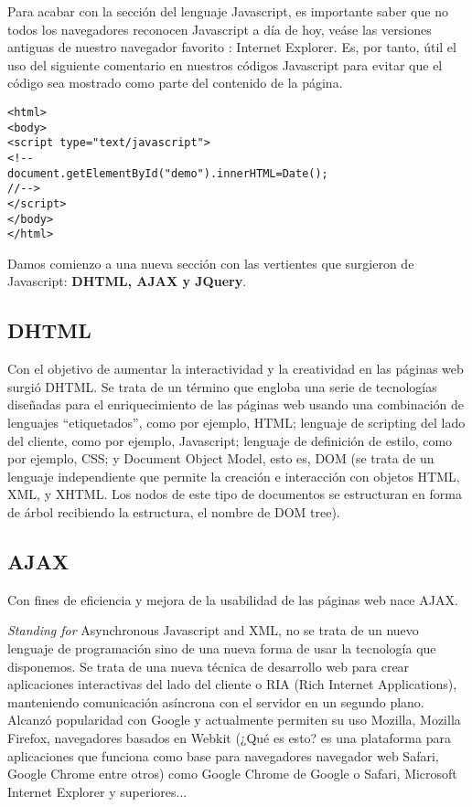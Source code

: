 \documentclass{apuntes}
\begin{document}
Para acabar con la sección del lenguaje Javascript, es importante saber que no todos los navegadores reconocen Javascript a día de hoy, veáse las versiones antiguas de nuestro navegador favorito : Internet Explorer. Es, por tanto, útil el uso del siguiente comentario en nuestros códigos Javascript para evitar que el código sea mostrado como parte del contenido de la página.

\begin{verbatim}
<html>
<body>
<script type="text/javascript">
<!--
document.getElementById("demo").innerHTML=Date();
//-->
</script>
</body>
</html>
\end{verbatim}

Damos comienzo a una nueva sección con las vertientes que surgieron de Javascript: \textbf{DHTML, AJAX y JQuery}. 

\subsection{DHTML }
Con el objetivo de aumentar la interactividad y la creatividad en las páginas web surgió DHTML. Se trata de un término que engloba una serie de tecnologías diseñadas para el enriquecimiento de las páginas web usando una combinación de lenguajes “etiquetados”, como por ejemplo, HTML; lenguaje de scripting del lado del cliente, como por ejemplo, Javascript; lenguaje de definición de estilo, como por ejemplo, CSS; y Document Object Model, esto es, DOM (se trata de un lenguaje independiente que permite la creación e interacción con objetos  HTML, XML, y  XHTML. Los nodos de este tipo de documentos se estructuran en forma de árbol recibiendo la estructura,  el nombre de DOM tree).


\subsection{AJAX}
Con fines de eficiencia y mejora de la usabilidad de las páginas web nace AJAX. 

\emph{Standing for} Asynchronous Javascript and XML, no se trata de un nuevo lenguaje de programación sino de una nueva forma de usar  la tecnología que disponemos. Se trata de una nueva técnica de desarrollo web para crear aplicaciones interactivas del lado del cliente o RIA (Rich Internet Applications), manteniendo comunicación asíncrona con el servidor en un segundo plano. Alcanzó popularidad con Google y actualmente permiten su uso Mozilla, Mozilla Firefox, navegadores basados en Webkit (¿Qué es esto? es una plataforma para aplicaciones que funciona como base para navegadores  navegador web Safari, Google Chrome entre otros) como Google Chrome de Google o Safari, Microsoft Internet Explorer  y superiores...
\end{document}

